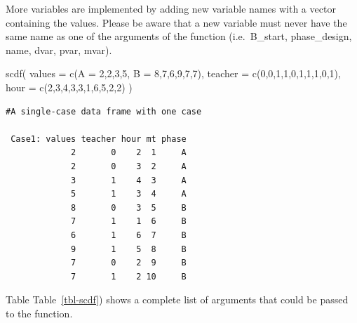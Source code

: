 \documentclass[
  letterpaper,
  DIV=11,
  numbers=noendperiod]{scrreprt}
\newenvironment{Shaded}{\begin{snugshade}}{\end{snugshade}}
\newcommand{\AttributeTok}[1]{\textcolor[rgb]{0.40,0.45,0.13}{#1}}
\newcommand{\DecValTok}[1]{\textcolor[rgb]{0.68,0.00,0.00}{#1}}
\newcommand{\FunctionTok}[1]{\textcolor[rgb]{0.28,0.35,0.67}{#1}}
\newcommand{\NormalTok}[1]{\textcolor[rgb]{0.00,0.23,0.31}{#1}}
\begin{document}
More variables are implemented by adding new variable names with a
vector containing the values. Please be aware that a new variable must
never have the same name as one of the arguments of the function
(i.e.~B\_start, phase\_design, name, dvar, pvar, mvar).

\begin{Shaded}
\begin{Highlighting}[]
\FunctionTok{scdf}\NormalTok{(}
  \AttributeTok{values =} \FunctionTok{c}\NormalTok{(}\AttributeTok{A =} \DecValTok{2}\NormalTok{,}\DecValTok{2}\NormalTok{,}\DecValTok{3}\NormalTok{,}\DecValTok{5}\NormalTok{, }\AttributeTok{B =} \DecValTok{8}\NormalTok{,}\DecValTok{7}\NormalTok{,}\DecValTok{6}\NormalTok{,}\DecValTok{9}\NormalTok{,}\DecValTok{7}\NormalTok{,}\DecValTok{7}\NormalTok{), }
  \AttributeTok{teacher =} \FunctionTok{c}\NormalTok{(}\DecValTok{0}\NormalTok{,}\DecValTok{0}\NormalTok{,}\DecValTok{1}\NormalTok{,}\DecValTok{1}\NormalTok{,}\DecValTok{0}\NormalTok{,}\DecValTok{1}\NormalTok{,}\DecValTok{1}\NormalTok{,}\DecValTok{1}\NormalTok{,}\DecValTok{0}\NormalTok{,}\DecValTok{1}\NormalTok{), }
  \AttributeTok{hour =} \FunctionTok{c}\NormalTok{(}\DecValTok{2}\NormalTok{,}\DecValTok{3}\NormalTok{,}\DecValTok{4}\NormalTok{,}\DecValTok{3}\NormalTok{,}\DecValTok{3}\NormalTok{,}\DecValTok{1}\NormalTok{,}\DecValTok{6}\NormalTok{,}\DecValTok{5}\NormalTok{,}\DecValTok{2}\NormalTok{,}\DecValTok{2}\NormalTok{)}
\NormalTok{)}
\end{Highlighting}
\end{Shaded}

\begin{verbatim}
#A single-case data frame with one case

 Case1: values teacher hour mt phase
             2       0    2  1     A
             2       0    3  2     A
             3       1    4  3     A
             5       1    3  4     A
             8       0    3  5     B
             7       1    1  6     B
             6       1    6  7     B
             9       1    5  8     B
             7       0    2  9     B
             7       1    2 10     B
\end{verbatim}

Table Table~\ref{tbl-scdf}) shows a complete list of arguments that
could be passed to the function.
\end{document}
